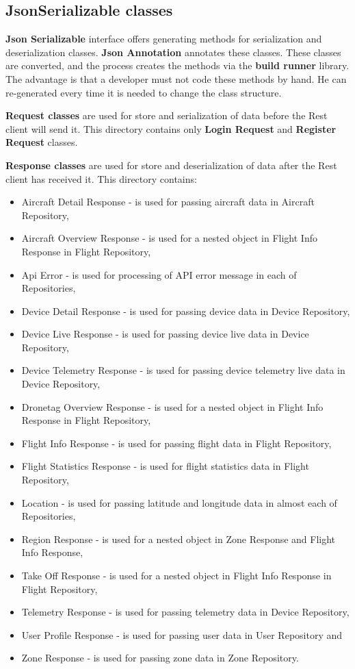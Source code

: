 \subsection{JsonSerializable classes}\label{subsec:jsonserializable-classes}
\textbf{Json Serializable} interface offers generating methods for serialization and deserialization classes.
\textbf{Json Annotation} annotates these classes.
These classes are converted, and the process creates the methods via the \textbf{build runner} library.
The advantage is that a developer must not code these methods by hand.
He can re-generated every time it is needed to change the class structure.

\textbf{Request classes} are used for store and serialization of data before the Rest client will send it.
This directory contains only \textbf{Login Request} and \textbf{Register Request} classes.

\textbf{Response classes} are used for store and deserialization of data after the Rest client has received it.
This directory contains:
\begin{itemize}
    \item Aircraft Detail Response - is used for passing aircraft data in Aircraft Repository,
    \item Aircraft Overview Response - is used for a nested object in Flight Info Response in Flight Repository,
    \item Api Error - is used for processing of API error message in each of Repositories,
    \item Device Detail Response - is used for passing device data in Device Repository,
    \item Device Live Response - is used for passing device live data in Device Repository,
    \item Device Telemetry Response - is used for passing device telemetry live data in Device Repository,
    \item Dronetag Overview Response - is used for a nested object in Flight Info Response in Flight Repository,
    \item Flight Info Response - is used for passing flight data in Flight Repository,
    \item Flight Statistics Response - is used for flight statistics data in Flight Repository,
    \item Location - is used for passing latitude and longitude data in almost each of Repositories,
    \item Region Response - is used for a nested object in Zone Response and Flight Info Response,
    \item Take Off Response - is used for a nested object in Flight Info Response in Flight Repository,
    \item Telemetry Response - is used for passing telemetry data in Device Repository,
    \item User Profile Response - is used for passing user data in User Repository and
    \item Zone Response - is used for passing zone data in Zone Repository.
\end{itemize}
